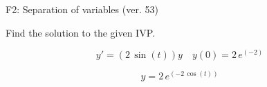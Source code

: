 \begin{exercise}
  \begin{exerciseTitle}F2: Separation of variables (ver. 53)\end{exerciseTitle}
  \begin{exerciseStatement}
    
Find the solution to the given IVP.

    
\[y'=( 2 \, \sin\left(t\right) )y\hspace{1em} y(0)= 2 \, e^{\left(-2\right)}\]

  \end{exerciseStatement}
  \begin{exerciseAnswer}
    
\[y= 2 \, e^{\left(-2 \, \cos\left(t\right)\right)}\]

  \end{exerciseAnswer}
\end{exercise}
